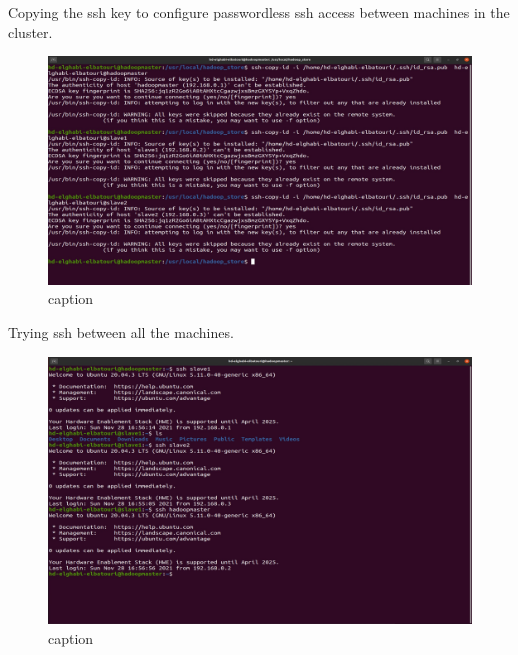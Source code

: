 \begin{spacing}{1.2}
\par Copying the ssh key to configure passwordless ssh access between machines in the cluster.
\\
\begin{figure}[!htb] 
\begin{center} 
\includegraphics[width=1\linewidth]{Big_Data/Hadoop/Multi-Nodes Cluster/ssh key between machines.jpg} 
\end{center} 
\caption{caption} 
\end{figure} 
\FloatBarrier



\par Trying ssh between all the machines.
\\
\begin{figure}[!htb] 
\begin{center} 
\includegraphics[width=1\linewidth]{Big_Data/Hadoop/Multi-Nodes Cluster/sshing between machines.jpg} 
\end{center} 
\caption{caption} 
\end{figure} 
\FloatBarrier


\end{spacing}
